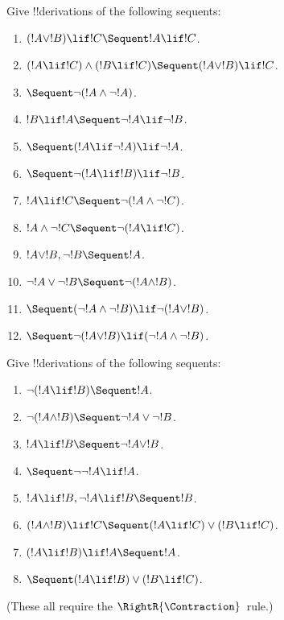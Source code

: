 \documentclass[../../../include/open-logic-section]{subfiles}
\begin{document}
\begin{prob}
Give !!{derivation}s of the following sequents:
\begin{enumerate}
\item $(!A \lor !B) \lif !C \Sequent !A \lif !C$.
\item $(!A \lif !C) \land (!B \lif !C) \Sequent (!A \lor !B) \lif !C$.
\item $\Sequent \lnot(!A \land \lnot !A)$.
\item $!B \lif !A \Sequent \lnot !A \lif \lnot !B$.
\item $\Sequent (!A \lif \lnot !A) \lif \lnot !A$.
\item $\Sequent \lnot(!A \lif !B) \lif \lnot !B$.
\item $!A \lif !C \Sequent \lnot (!A \land \lnot !C)$.
\item $!A \land \lnot !C \Sequent \lnot (!A \lif !C)$.
\item $!A \lor !B, \lnot !B \Sequent !A$.
\item $\lnot !A \lor \lnot !B \Sequent \lnot(!A \land !B)$.
\item $\Sequent (\lnot !A \land \lnot !B) \lif\lnot(!A \lor !B)$.
\item $\Sequent \lnot(!A \lor !B) \lif (\lnot !A \land \lnot !B)$.
\end{enumerate}
\end{prob}

\begin{prob}
Give !!{derivation}s of the following sequents:
\begin{enumerate}
\item $\lnot(!A \lif !B) \Sequent !A$.
\item $\lnot(!A \land !B) \Sequent \lnot !A \lor \lnot !B$.
\item $!A \lif !B \Sequent \lnot !A \lor !B$.
\item $\Sequent \lnot \lnot !A \lif !A$.
\item $!A \lif !B, \lnot !A \lif !B \Sequent !B$.
\item $(!A \land !B) \lif !C \Sequent (!A \lif !C) \lor (!B \lif !C)$.
\item $(!A \lif !B) \lif !A \Sequent !A$.
\item $\Sequent (!A \lif !B) \lor (!B \lif !C)$.
\end{enumerate}
(These all require the $\RightR{\Contraction}$~rule.)
\end{prob}
\end{document}
